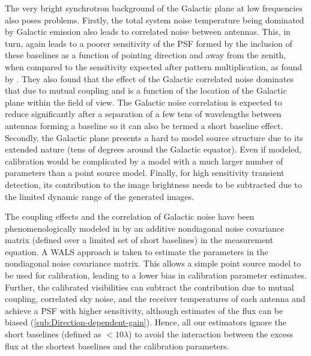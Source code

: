 \documentclass{aa}
\begin{document}
The very bright synchrotron background  of the Galactic plane at low frequencies
also poses problems. Firstly, the total system noise temperature being dominated
by Galactic emission  also leads to correlated noise  between antennas. This, in
turn, again leads to a poorer sensitivity  of the PSF formed by the inclusion of
these baselines  as a function of  pointing direction and away  from the zenith,
when compared to the sensitivity expected after pattern multiplication, as found
by  \citet{ellingson2011sensitivity}.  They also  found that  the effect  of the
Galactic  correlated  noise dominates  that  due to  mutual  coupling  and is  a
function of  the location of  the Galactic plane  within the field of  view. The
Galactic  noise  correlation  is   expected  to  reduce  significantly  after  a
separation of a few tens of wavelengths between antennas forming a baseline
so it can  also be termed  a short baseline  effect.  Secondly, the  Galactic plane
presents a  hard to model source structure  due to its extended  nature (tens of
degrees around  the Galactic  equator).  Even if  modeled, calibration  would be
complicated by a model with a much larger number of parameters than a point source
model.  Finally,  for high sensitivity  transient detection, its  contribution to
the image brightness needs to be  subtracted due to the limited dynamic range of
the generated images.

The  coupling  effects   and  the  correlation  of  Galactic   noise  have  been
phenomenologically   modeled  in   \citet{wijnholds2010self}   by  an   additive
nondiagonal  noise  covariance matrix  (defined  over  a  limited set  of  short
baselines) in the measurement equation. A WALS approach is taken to estimate the
parameters in  the nondiagonal  noise covariance matrix.   This allows  a simple
point  source model  to be  used for  calibration, leading  to a  lower  bias in
calibration  parameter  estimates.   Further,  the calibrated  visibilities  can
subtract the contribution due to  mutual coupling, correlated sky noise, and the
receiver temperatures of each antenna and achieve a PSF with higher sensitivity,
although      estimates      of       the      flux      can      be      biased
(\ref{sub:Direction-dependent-gain}).   Hence,  all  our estimators  ignore  the
short baselines (defined  as $<10\lambda$) to avoid the  interaction between the
excess flux at the shortest baselines and the calibration parameters.

\end{document}
